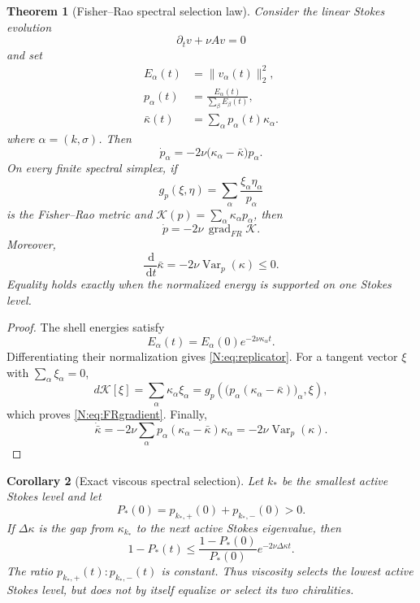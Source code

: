 \documentclass[
 aps,
 prd,
 reprint,
 amsmath,
 amssymb,
 nofootinbib,
 superscriptaddress
]{revtex4-2}
\newtheorem{theorem}{Theorem}[section]
\newtheorem{corollary}[theorem]{Corollary}
\theoremstyle{definition}
\theoremstyle{remark}
\newcommand{\dd}{\,\mathrm d}
\begin{document}
\begin{theorem}[Fisher--Rao spectral selection law]
\label{N:thm:fisher}
Consider the linear Stokes evolution
\[
       \partial_t v+\nu Av=0
\]
and set
\[
\begin{aligned}
 E_\alpha(t)&=\|v_\alpha(t)\|_2^2,\\
 p_\alpha(t)&=
 \frac{E_\alpha(t)}{\sum_\beta E_\beta(t)},\\
 \bar\kappa(t)&=
 \sum_\alpha p_\alpha(t)\kappa_\alpha.
\end{aligned}
\]
where \(\alpha=(k,\sigma)\).
Then
\begin{equation}
 \boxed{
 \dot p_\alpha
 =
 -2\nu
 \bigl(\kappa_\alpha-\bar\kappa\bigr)p_\alpha.
 }
 \label{N:eq:replicator}
\end{equation}
On every finite spectral simplex, if
\[
 g_p(\xi,\eta)
 =
 \sum_\alpha\frac{\xi_\alpha\eta_\alpha}{p_\alpha}
\]
is the Fisher--Rao metric and
\(\mathcal K(p)=\sum_\alpha\kappa_\alpha p_\alpha\), then
\begin{equation}
 \boxed{
 \dot p=-2\nu\,\operatorname{grad}_{FR}\mathcal K.
 }
 \label{N:eq:FRgradient}
\end{equation}
Moreover,
\begin{equation}
 \boxed{
 \frac{\dd}{\dd t}\bar\kappa
 =
 -2\nu\operatorname{Var}_{p}(\kappa)
 \le0.
 }
 \label{N:eq:meanKdecay}
\end{equation}
Equality holds exactly when the normalized energy is supported on one
Stokes level.
\end{theorem}

\begin{proof}
The shell energies satisfy
\[
 E_\alpha(t)
 =
 E_\alpha(0)e^{-2\nu\kappa_\alpha t}.
\]
Differentiating their normalization gives
\eqref{N:eq:replicator}.  For a tangent vector \(\xi\) with
\(\sum_\alpha\xi_\alpha=0\),
\[
 d\mathcal K[\xi]
 =
 \sum_\alpha\kappa_\alpha\xi_\alpha
 =
 g_p\!\left(
 \bigl(p_\alpha(\kappa_\alpha-\bar\kappa)\bigr)_\alpha,
 \xi
 \right),
\]
which proves \eqref{N:eq:FRgradient}.  Finally,
\[
 \dot{\bar\kappa}
 =
 -2\nu
 \sum_\alpha
 p_\alpha(\kappa_\alpha-\bar\kappa)\kappa_\alpha
 =
 -2\nu\operatorname{Var}_{p}(\kappa).
\]
\end{proof}

\begin{corollary}[Exact viscous spectral selection]
\label{N:cor:selection}
Let \(k_*\) be the smallest active Stokes level and let
\[
 P_*(0)
 =
 p_{k_*,+}(0)+p_{k_*,-}(0)>0.
\]
If \(\Delta\kappa\) is the gap from \(\kappa_{k_*}\) to the next active
Stokes eigenvalue, then
\begin{equation}
 1-P_*(t)
 \le
 \frac{1-P_*(0)}{P_*(0)}
 e^{-2\nu\Delta\kappa t}.
 \label{N:eq:selectionrate}
\end{equation}
The ratio
\(p_{k_*,+}(t):p_{k_*,-}(t)\)
is constant.  Thus viscosity selects the lowest active Stokes
\emph{level}, but does not by itself equalize or select its two chiralities.
\end{corollary}
\end{document}
